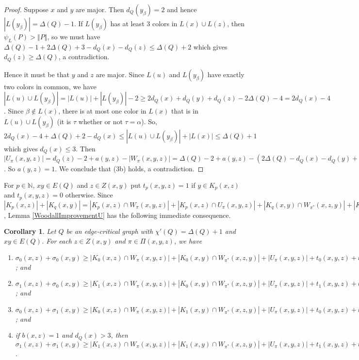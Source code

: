 \documentclass[12pt,reqno]{amsart}
\theoremstyle{plain}
\newtheorem{cor}[thm]{Corollary}
\theoremstyle{definition}
\theoremstyle{remark}
\newcommand{\IN}{\mathbb{N}}
\newcommand{\card}[1]{\left|#1\right|}
\newcommand{\size}[1]{\left\Vert#1\right\Vert}
\begin{document}
\begin{proof}
Suppose $x$ and $y$ are major.  Then $d_Q(y_\beta) = 2$ and hence $\card{L(y_\beta)} = \Delta(Q) - 1$.  If $L(y_\beta)$ has at least $3$ colors in $L(x) \cup L(z)$, then $\psi_L(P) > \size{P}$, so we must have $\Delta(Q) - 1 + 2\Delta(Q) + 3 - d_Q(x) - d_Q(z) \le \Delta(Q) + 2$ which gives $d_Q(z) \ge \Delta(Q)$, a contradiction.  

Hence it must be that $y$ and $z$ are major.  Since $L(u)$ and $L(y_\beta)$ have exactly two colors in common, we have $\card{L(u) \cup L(y_\beta)} = \card{L(u)} + \card{L(y_\beta)} - 2 \ge 2d_Q(x) + d_Q(y) + d_Q(z) - 2\Delta(Q) - 4 = 2d_Q(x) - 4$.  Since $\beta \not \in L(x)$, there is at most one color in $L(x)$ that is in $L(u) \cup L(y_\beta)$ (it is $\tau$ whether or not $\tau = \alpha$).  So, $2d_Q(x) - 4 + \Delta(Q) + 2 - d_Q(x) \le \card{L(u) \cup L(y_\beta)} + \card{L(x)} \le \Delta(Q) + 1$ which gives $d_Q(x) \le 3$.  Then $\card{U_\pi(x,y,z)} = d_Q(z) - 2 + a(y, z) - \card{W_\pi(x,y,z)} =  \Delta(Q) - 2 + a(y, z) - (2\Delta(Q) - d_Q(x) - d_Q(y) + 1) = a(y, z)$.  So $a(y, z) = 1$. We conclude that (3b) holds, a contradiction.
\end{proof}

For $p \in \IN$, $xy \in E(Q)$ and $z \in Z(x, y)$ put $t_p(x, y, z) = 1$ if $y \in K_p(x, z)$ and $t_p(x, y, z) = 0$ otherwise.  Since $\card{K_p(x, z)} + \card{K_q(x, y)} = \card{K_p(x, z) \cap W_\pi(x, y, z)} + \card{K_p(x, z) \cap U_\pi(x, y, z)} + \card{K_q(x, y)  \cap W_{\pi^*}(x, z, y)} + \card{K_q(x, y) \cap U_{\pi^*}(x, z, y)} + t_p(x, y, z) + t_q(x, z, y)$, Lemma \ref{WoodallImprovementU} has the following immediate consequence.  

\begin{cor}\label{AdditionOfUParts}
Let $Q$ be an edge-critical graph with $\chi'(Q) = \Delta(Q) + 1$ and $xy \in E(Q)$.  For each $z \in Z(x, y)$ and $\pi \in \Pi(x,y,z)$, we have 
\begin{enumerate}
\item $\sigma_0(x, z) + \sigma_0(x, y) \ge \card{K_0(x, z) \cap W_\pi(x, y, z)} + \card{K_0(x, y) \cap W_{\pi^*}(x, z, y)} + \card{U_\pi(x, y, z)} + t_0(x, y, z) + t_0(x, z, y)$; and
\item $\sigma_1(x, z) + \sigma_0(x, y) \ge \card{K_1(x, z) \cap W_\pi(x, y, z)} + \card{K_0(x, y) \cap W_{\pi^*}(x, z, y)} + \card{U_\pi(x, y, z)} + t_1(x, y, z) + t_0(x, z, y)$; and
\item $\sigma_0(x, z) + \sigma_1(x, y) \ge \card{K_0(x, z) \cap W_\pi(x, y, z)} + \card{K_1(x, y) \cap W_{\pi^*}(x, z, y)} + \card{U_\pi(x, y, z)} + t_0(x, y, z) + t_1(x, z, y)$; and
\item if $b(x, z) = 1$ and $d_Q(x) > 3$, then $\sigma_1(x, z) + \sigma_1(x, y) \ge \card{K_1(x, z) \cap W_\pi(x, y, z)} + \card{K_1(x, y) \cap W_{\pi^*}(x, z, y)} + \card{U_\pi(x, y, z)} + t_1(x, y, z) + t_1(x, z, y)$.
\end{enumerate}
\end{cor}
\end{document}
